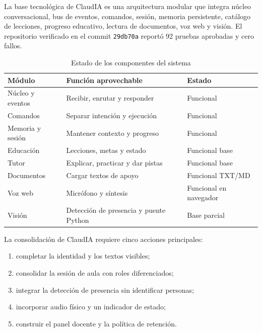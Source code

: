 \documentclass[11pt]{article}
\newcommand{\Section}[1]{\par\vspace{0.16\baselineskip}{\normalfont\normalsize\bfseries\RaggedRight #1\par}}
\begin{document}
\clearpage

\Section{Desarrollo e integración del sistema}

La base tecnológica de ClaudIA es una arquitectura modular que integra núcleo conversacional, bus de eventos, comandos, sesión, memoria persistente, catálogo de lecciones, progreso educativo, lectura de documentos, voz web y visión. El repositorio verificado en el commit \texttt{29db70a} reportó 92 pruebas aprobadas y cero fallos.

\begin{table}[H]
\centering
\caption{Estado de los componentes del sistema}
\small
\begin{tabularx}{\textwidth}{@{}>{\raggedright\arraybackslash}p{1.55in}>{\raggedright\arraybackslash}X>{\centering\arraybackslash}p{0.85in}@{}}
\toprule
\textbf{Módulo} & \textbf{Función aprovechable} & \textbf{Estado} \\
\midrule
Núcleo y eventos & Recibir, enrutar y responder & Funcional \\
Comandos & Separar intención y ejecución & Funcional \\
Memoria y sesión & Mantener contexto y progreso & Funcional \\
Educación & Lecciones, metas y estado & Funcional base \\
Tutor & Explicar, practicar y dar pistas & Funcional base \\
Documentos & Cargar textos de apoyo & Funcional TXT/MD \\
Voz web & Micrófono y síntesis & Funcional en navegador \\
Visión & Detección de presencia y puente Python & Base parcial \\
\bottomrule
\end{tabularx}
\end{table}

La consolidación de ClaudIA requiere cinco acciones principales:
\begin{enumerate}
  \item completar la identidad y los textos visibles;
  \item consolidar la sesión de aula con roles diferenciados;
  \item integrar la detección de presencia sin identificar personas;
  \item incorporar audio físico y un indicador de estado;
  \item construir el panel docente y la política de retención.
\end{enumerate}
\end{document}
